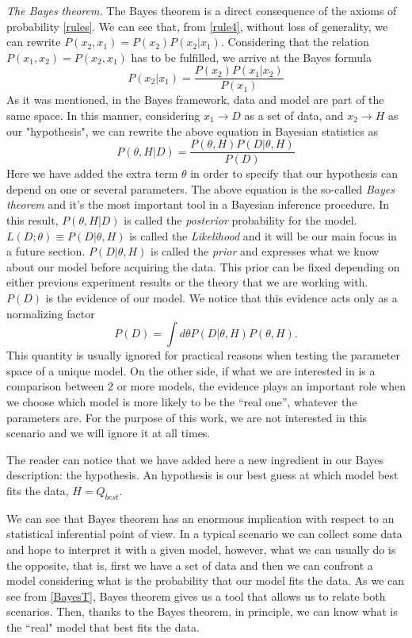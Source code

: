 \documentclass[onecolumn,           %
               showpacs,            %
               preprintnumbers,     %
               aps,                 %
               prl,          	    %
               letterpaper,             %
               superscriptaddress,      %
               nofootinbib,         %
               tightenlines,        %
               floats,floatfix      %
               ,usenatbib,
               ]{revtex4-1}
\begin{document}
\textit{The Bayes theorem.} The Bayes theorem is a direct consequence of the axioms of probability \eqref{rules}. We can see that, from \eqref{rule4}, without loss of generality, we can rewrite $P(x_2,x_1)=P(x_2)P(x_2|x_1)$. Considering that the relation $P(x_1,x_2)=P(x_2,x_1)$ has to be fulfilled, we arrive at the Bayes formula   
\begin{equation}
P(x_2|x_1)=\frac{P(x_2)P(x_1|x_2)}{P(x_1)}
\end{equation}
As it was mentioned, in the Bayes framework, data and model are part of the same space. In this manner, considering $x_1\rightarrow D$ as a set of data, and $x_2\rightarrow H$ as our "hypothesis", we can rewrite the above equation in Bayesian statistics as
\begin{equation}\label{BayesT}
P(\theta,H|D)=\frac{P(\theta,H)P(D|\theta,H)}{P(D)}
\end{equation}
Here we have added the extra term $\theta$ in order to specify that our hypothesis can depend on one or several parameters. 
The above equation is the so-called \textit{Bayes theorem} and it's the most important tool in a Bayesian inference procedure. In this result, $P(\theta,H|D)$ is called the \textit{posterior} probability for the model. $L(D;\theta)\equiv P(D|\theta,H)$ is called the \textit{Likelihood} and it will be our main focus in a future section. $P(D|\theta,H)$ is called the \textit{prior} and expresses what we know about our model before acquiring the data. This prior can be fixed depending on either previous experiment results or the theory that we are working with. $P(D)$ is the evidence of our model. We notice that this evidence acts only as a normalizing factor
\begin{equation}\label{PD}
P(D)=\int d\theta P(D|\theta,H)P(\theta,H).
\end{equation}
This quantity is usually ignored for practical reasons when testing the parameter space of a unique model. On the other side, if what we are interested in is a comparison between 2 or more models, the evidence plays an important role when we choose which model is more likely to be the ``real one'', whatever the parameters are. For the purpose of this work, we are not interested in this scenario and we will ignore it at all times.

The reader can notice that we have added here a new ingredient in our Bayes description: the hypothesis. An hypothesis is our best guess at which model best fits the data, $H=Q_{best}$.

We can see that Bayes theorem has an enormous implication with respect to an statistical inferential point of view. In a typical scenario we can collect some data and hope to interpret it with a given model, however, what we can usually do is the opposite, that is, first we have a set of data and then we can confront a model considering what is the probability that our model fits the data. As we can see from \eqref{BayesT}, Bayes theorem gives us a tool that allows us to relate both scenarios. Then, thanks to the Bayes theorem, in principle, we can know what is the ``real" model that best fits the data. 
\end{document}
